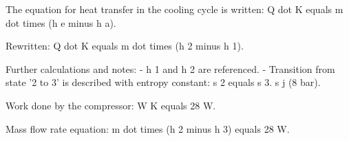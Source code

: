 The equation for heat transfer in the cooling cycle is written:  
Q dot K equals m dot times (h e minus h a).  

Rewritten:  
Q dot K equals m dot times (h 2 minus h 1).  

Further calculations and notes:  
- h 1 and h 2 are referenced.  
- Transition from state '2 to 3' is described with entropy constant:  
s 2 equals s 3.  
s j (8 bar).  

Work done by the compressor:  
W K equals 28 W.  

Mass flow rate equation:  
m dot times (h 2 minus h 3) equals 28 W.